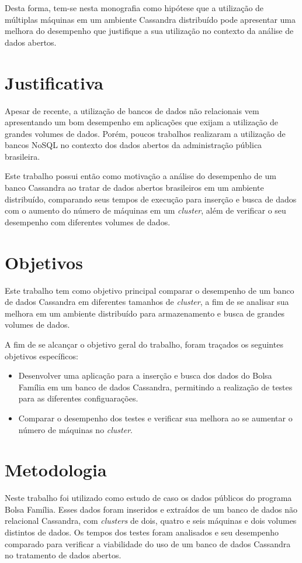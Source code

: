 Desta forma, tem-se nesta monografia como hipótese que a utilização de múltiplas máquinas em um ambiente Cassandra distribuído pode apresentar uma melhora do desempenho que justifique a sua utilização no contexto da análise de dados abertos.

\section{Justificativa}
Apesar de recente, a utilização de bancos de dados não relacionais vem apresentando um bom desempenho em aplicações que exijam a utilização de grandes volumes de dados. Porém, poucos trabalhos realizaram a utilização de bancos NoSQL no contexto dos dados abertos da administração pública brasileira. 

Este trabalho possui então como motivação a análise do desempenho de um banco Cassandra ao tratar de dados abertos brasileiros em um ambiente distribuído, comparando seus tempos de execução para inserção e busca de dados com o aumento do número de máquinas em um \emph{cluster}, além de verificar o seu desempenho com diferentes volumes de dados.

\section{Objetivos}

Este trabalho tem como objetivo principal comparar o desempenho de um banco de dados Cassandra em diferentes tamanhos de \emph{cluster}, a fim de se analisar sua melhora em um ambiente distribuído para armazenamento e busca de grandes volumes de dados.

A fim de se alcançar o objetivo geral do trabalho, foram traçados os seguintes objetivos específicos:
\begin{itemize}
	\item Desenvolver uma aplicação para a inserção e busca dos dados do Bolsa Família em um banco de dados Cassandra, permitindo a realização de testes para as diferentes configuarações.
	
	\item Comparar o desempenho dos testes e verificar sua melhora ao se aumentar o número de máquinas no \emph{cluster}.
\end{itemize}

\section{Metodologia}
Neste trabalho foi utilizado como estudo de caso os dados públicos do programa Bolsa Família. Esses dados foram inseridos e extraídos de um banco de dados não relacional Cassandra, com \emph{clusters} de dois, quatro e seis máquinas e dois volumes distintos de dados. Os tempos dos testes foram analisados e seu desempenho comparado para verificar a viabilidade do uso de um banco de dados Cassandra no tratamento de dados abertos.

